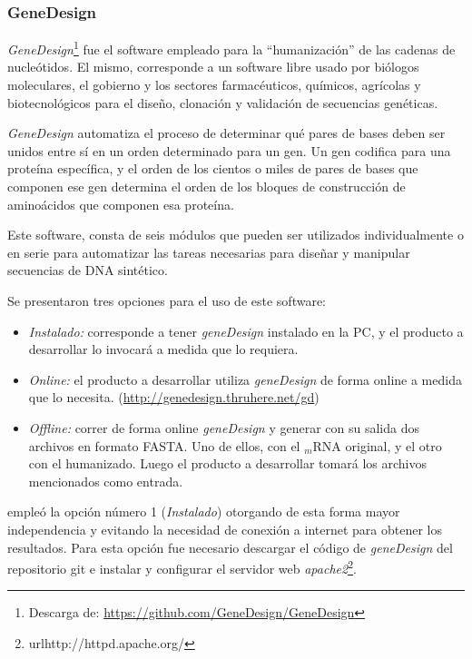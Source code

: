 \subsubsection{GeneDesign}
\emph{GeneDesign}\footnote{Descarga de: \url{https://github.com/GeneDesign/GeneDesign}}\cite{geneDesign} fue el software empleado para la ``humanización'' de las cadenas de nucleótidos. El mismo, corresponde a un software libre usado por biólogos moleculares, el gobierno y los sectores farmacéuticos, químicos, agrícolas y biotecnológicos para el diseño\cite{Welch}, clonación y validación de secuencias genéticas.

\par \emph{GeneDesign} automatiza el proceso de determinar qué pares de bases deben ser unidos entre sí en un orden determinado para un gen. Un gen codifica para una proteína específica, y el orden de los cientos o miles de pares de bases que componen ese gen determina el orden de los bloques de construcción de aminoácidos que componen esa proteína.  

\par Este software, consta de seis módulos que pueden ser utilizados individualmente o en serie para automatizar las tareas necesarias para diseñar y manipular secuencias de DNA sintético. 

\par Se presentaron tres opciones para el uso de este software:
	\begin{itemize}
		\item \emph{Instalado:} corresponde a tener \emph{geneDesign} instalado en la PC, y el producto a desarrollar lo invocará a medida que lo requiera.
		\item \emph{Online:} el producto a desarrollar utiliza \emph{geneDesign} de forma online a medida que lo necesita. (\url{http://genedesign.thruhere.net/gd})
		\item \emph{Offline:} correr de forma online \emph{geneDesign} y generar con su salida dos archivos en formato FASTA. Uno de ellos, con el $_m$RNA original, y el otro con el humanizado. Luego el producto a desarrollar tomará los archivos mencionados como entrada.
	\end{itemize}
	
\par \remo empleó la opción número 1 (\emph{Instalado}) otorgando de esta forma mayor independencia y evitando la necesidad de conexión a internet para obtener los resultados. Para esta opción fue necesario descargar el código de \emph{geneDesign} del repositorio git e instalar y configurar el servidor web \emph{apache2}\footnote{url{http://httpd.apache.org/}}.

